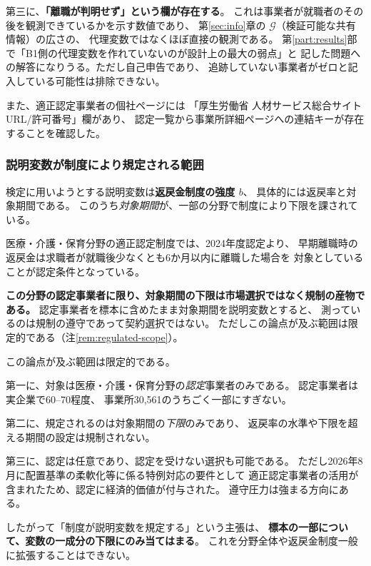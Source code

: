 第三に、\textbf{「離職が判明せず」という欄が存在する}。
これは事業者が就職者のその後を観測できているかを示す数値であり、
第\ref{sec:info}章の $\mathcal{G}$（検証可能な共有情報）の広さの、
代理変数ではなくほぼ直接の観測である。
第\ref{part:results}部で「B1側の代理変数を作れていないのが設計上の最大の弱点」と
記した問題への解答になりうる。ただし自己申告であり、
追跡していない事業者がゼロと記入している可能性は排除できない。

また、適正認定事業者の個社ページには
「厚生労働省 人材サービス総合サイトURL/許可番号」欄があり、
認定一覧から事業所詳細ページへの連結キーが存在することを確認した。

\subsubsection{説明変数が制度により規定される範囲}
\label{sec:regulated-regressor}

検定に用いようとする説明変数は\textbf{返戻金制度の強度 $b$}、
具体的には返戻率と対象期間である。
このうち\emph{対象期間}が、一部の分野で制度により下限を課されている。

医療・介護・保育分野の適正認定制度では、2024年度認定より、
早期離職時の返戻金は求職者が就職後少なくとも6か月以内に離職した場合を
対象としていることが認定条件となっている。

\textbf{この分野の認定事業者に限り、対象期間の下限は市場選択ではなく規制の産物である。}
認定事業者を標本に含めたまま対象期間を説明変数とすると、
測っているのは規制の遵守であって契約選択ではない。
ただしこの論点が及ぶ範囲は限定的である（注\ref{rem:regulated-scope}）。

\begin{remark}[適用範囲の限定]
\label{rem:regulated-scope}
この論点が及ぶ範囲は限定的である。

第一に、対象は医療・介護・保育分野の\emph{認定}事業者のみである。
認定事業者は実企業で60--70程度、
事業所30,561のうちごく一部にすぎない。

第二に、規定されるのは対象期間の\emph{下限}のみであり、
返戻率の水準や下限を超える期間の設定は規制されない。

第三に、認定は任意であり、認定を受けない選択も可能である。
ただし2026年8月に配置基準の柔軟化等に係る特例対応の要件として
適正認定事業者の活用が含まれたため、認定に経済的価値が付与された。
遵守圧力は強まる方向にある。

したがって「制度が説明変数を規定する」という主張は、
\textbf{標本の一部について、変数の一成分の下限にのみ当てはまる}。
これを分野全体や返戻金制度一般に拡張することはできない。
\end{remark}

